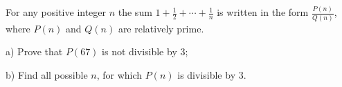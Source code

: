 For any positive integer $n$ the sum $\displaystyle 1+\frac 12+ \cdots + \frac 1n$ is written in the form $\displaystyle \frac{P(n)}{Q(n)}$, where $P(n)$ and $Q(n)$ are relatively prime.

a) Prove that $P(67)$ is not divisible by 3;

b) Find all possible $n$, for which $P(n)$ is divisible by 3.